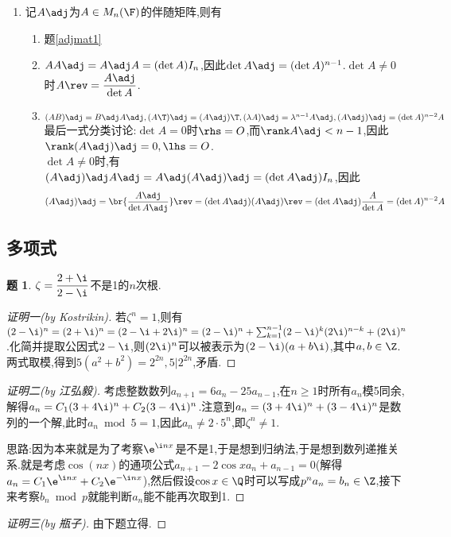 \documentclass{article}
\theoremstyle{definition}
\newtheorem{exercise}{题}[section]
\begin{document}
\begin{enumerate}
    \item 记$A\adj$为$A\in M_n(\F)$的伴随矩阵,则有\begin{enumerate}
        \item 题\ref{adjmat1}
        \item $AA\adj=A\adj A=(\det A)I_n$,因此$\det A\adj=(\det A)^{n-1}$.$\det A\neq 0$时$A\rev=\dfrac{A\adj}{\det A}$.
        \item $(AB)\adj=B\adj A\adj, (A\T)\adj=(A\adj)\T, (\lambda A)\adj=\lambda^{n-1}A\adj, (A\adj)\adj=(\det A)^{n-2}A$\\
        最后一式分类讨论:$\det A=0$时$\rhs=O$,而$\rank A\adj< n-1$,因此$\rank (A\adj)\adj=0, \lhs=O$.\\
        $\det A\neq 0$时,有$(A\adj)\adj A\adj=A\adj(A\adj)\adj=(\det A\adj)I_n$,因此$$(A\adj)\adj=\br{\dfrac{A\adj}{\det A\adj}}\rev=(\det A\adj)(A\adj)\rev=(\det A\adj)\dfrac{A}{\det A}=(\det A)^{n-2}A$$
    \end{enumerate}
\end{enumerate}

\subsection{多项式}
\begin{exercise}
    $\zeta=\dfrac{2+\i}{2-\i}$不是1的$n$次根.
\end{exercise}
\begin{proof}[证明一(by Kostrikin)]
    若$\zeta^n=1$,则有$ (2-\i)^n=(2+\i)^n=(2-\i+2\i)^n=(2-\i)^n+\sum_{k=1}^{n-1}(2-\i)^k(2\i)^{n-k}+(2\i)^n$.化简并提取公因式$2-\i$,则$(2\i)^n$可以被表示为$(2-\i)(a+b\i)$,其中$a,b\in \Z$.两式取模,得到$5(a^2+b^2)=2^{2n}, 5|2^{2n}$,矛盾.
\end{proof}
\begin{proof}[证明二(by 江弘毅)]
    考虑整数数列$a_{n+1}=6a_n-25a_{n-1}$,在$n\geq 1$时所有$a_n$模5同余,解得$a_n=C_1 (3+4\i)^n+C_2 (3-4\i)^n$.注意到$a_n=(3+4\i)^n+(3-4\i)^n$是数列的一个解,此时$a_n\bmod 5=1$,因此$a_n\neq 2\cdot 5^n$,即$\zeta^n\neq 1$.

    思路:因为本来就是为了考察$\e^{\i nx}$是不是1,于是想到归纳法,于是想到数列递推关系.就是考虑$\cos(nx)$的通项公式$a_{n+1}-2\cos x a_n+a_{n-1}=0$(解得$a_n=C_1\e^{\i nx}+C_2\e^{-\i nx}$),然后假设$\cos x\in \Q$时可以写成$p^n a_n=b_n\in \Z$,接下来考察$b_n\bmod p$就能判断$a_n$能不能再次取到1.
\end{proof}
\begin{proof}[证明三(by 瓶子)]
    由下题立得.
\end{proof}
\end{document}
